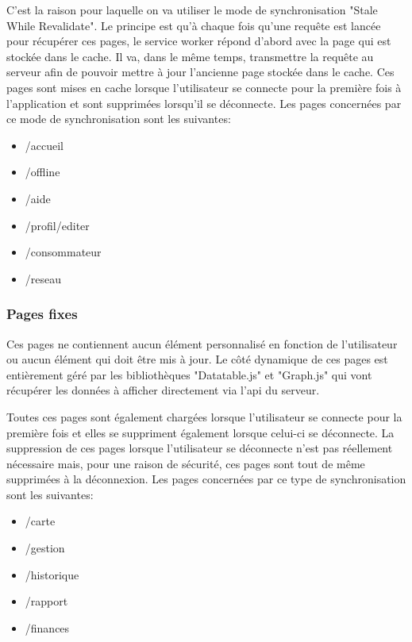 \documentclass{EPL-master-thesis-covers-FR}
\begin{document}
				 	C'est la raison pour laquelle on va utiliser le mode de synchronisation "Stale While Revalidate". Le principe est qu'à chaque fois qu'une requête est lancée pour récupérer ces pages, le service worker répond d'abord avec la page qui est stockée dans le cache. Il va, dans le même temps, transmettre la requête au serveur afin de pouvoir mettre à jour l'ancienne page stockée dans le cache. Ces pages sont mises en cache lorsque l'utilisateur se connecte pour la première fois à l'application et sont supprimées lorsqu'il se déconnecte. Les pages concernées par ce mode de synchronisation sont les suivantes:
				 	\begin{itemize}[noitemsep]
				 		\item /accueil
				 		\item /offline
				 		\item /aide
				 		\item /profil/editer
				 		\item /consommateur
				 		\item /reseau
				 	\end{itemize}
				 	
				 	
				\subsubsection*{Pages fixes} 
					Ces pages ne contiennent aucun élément personnalisé en fonction de l'utilisateur ou aucun élément qui doit être mis à jour. Le côté dynamique de ces pages est entièrement géré par les bibliothèques "Datatable.js" et "Graph.js" qui vont récupérer les données à afficher directement via l'\gls{api} du serveur. 
				
					Toutes ces pages sont également chargées lorsque l'utilisateur se connecte pour la première fois et elles se suppriment également lorsque celui-ci se déconnecte. La suppression de ces pages lorsque l'utilisateur se déconnecte n'est pas réellement nécessaire mais, pour une raison de sécurité, ces pages sont tout de même supprimées à la déconnexion. Les pages concernées par ce type de synchronisation sont les suivantes:
					\begin{itemize}[noitemsep]
						\item /carte
						\item /gestion
						\item /historique
						\item /rapport
						\item /finances
					\end{itemize}					
				
\end{document}
